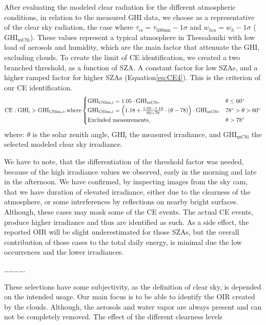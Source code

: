 \documentclass[
]{article}
\begin{document}
After evaluating the modeled clear radiation for the different atmospheric
conditions, in relation to the measured GHI data, we choose as a representative of
the clear sky radiation, the case where
\(\tau_{\text{cs}} = \tau_{500\text{nm}} - 1\sigma\) and \(w_{h\text{cs}} = w_h - 1\sigma\)
(\(\text{GHI}_\text{mCSi}\)).
These values represent a typical atmosphere in Thessaloniki with low load of aerosols
and humidity, which are the main factor that attenuate the GHI, excluding clouds. To
create the limit of CE identification, we created a two branched threshold, as a
function of SZA. A constant factor for low SZAs, and a higher ramped factor for
higher SZAs (Equation\nobreakspace\ref{eq:CE4}).
This is the criterion of our CE identification.
\begin{equation}
\text{CE} : \text{GHI}_\text{i} > \text{GHI}_\text{CSlim,i}, \text{where} \begin{cases}
 \text{GHI}_\text{CSlim,i} = 1.05 \cdot \text{GHI}_\text{mCSi}, & \text{$\theta \leq 60^\circ$}\\
\text{GHI}_\text{CSlim,i} = \left ({ 1.18 + \frac{1.05 - 1.18}{60 - 78} \cdot (\theta- 78) } \right ) \cdot \text{GHI}_\text{mCSi}, & \text{$ 78^\circ > \theta > 60^\circ$}\\
\text{Excluded measurements}, & \theta > 78^\circ
\end{cases}\label{eq:CE4}
\end{equation}
where: \(\theta\) is the solar zenith angle, \(\text{GHI}_\text{i}\) the measured
irradiance, and \(\text{GHI}_\text{mCSi}\) the selected modeled clear sky irradiance.

We have to note, that the differentiation of the threshold factor was needed, because
of the high irradiance values we observed, early in the morning and late in the
afternoon. We have confirmed, by inspecting images from the sky cam, that we have
duration of elevated irradiance, either due to the clearness of the atmosphere, or some
interferences by reflections on nearby bright surfaces. Although, these cases may
mask some of the CE events. The actual CE events, produce higher irradiance and thus
are identified as such. As a side effect, the reported OIR will be slight
underestimated for those SZAs, but the overall contribution of those cases to the
total daily energy, is minimal due the low occurrences and the lower irradiances.

\ldots\ldots\ldots\ldots.

These selections have some subjectivity, as the definition of clear sky, is depended
on the intended usage. Our main focus is to be able to identify the OIR created by the
clouds. Although, the aerosols and water vapor are always present and can not be
completely removed.
The effect of the different clearness levels
\end{document}

